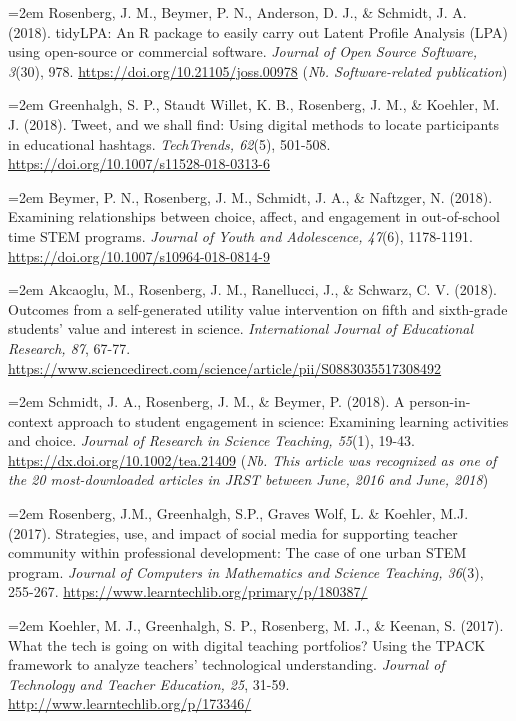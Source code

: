 \documentclass[14,]{article}
\begin{document}
\hangindent=2em Rosenberg, J. M., Beymer, P. N., Anderson, D. J., \&
Schmidt, J. A. (2018). tidyLPA: An R package to easily carry out Latent
Profile Analysis (LPA) using open-source or commercial software.
\emph{Journal of Open Source Software, 3}(30), 978.
\url{https://doi.org/10.21105/joss.00978} (\emph{Nb. Software-related
publication})

\hangindent=2em Greenhalgh, S. P., Staudt Willet, K. B., Rosenberg, J.
M., \& Koehler, M. J. (2018). Tweet, and we shall find: Using digital
methods to locate participants in educational hashtags.
\emph{TechTrends, 62}(5), 501-508.
\url{https://doi.org/10.1007/s11528-018-0313-6}

\hangindent=2em Beymer, P. N., Rosenberg, J. M., Schmidt, J. A., \&
Naftzger, N. (2018). Examining relationships between choice, affect, and
engagement in out-of-school time STEM programs. \emph{Journal of Youth
and Adolescence, 47}(6), 1178-1191.
\url{https://doi.org/10.1007/s10964-018-0814-9}

\hangindent=2em Akcaoglu, M., Rosenberg, J. M., Ranellucci, J., \&
Schwarz, C. V. (2018). Outcomes from a self-generated utility value
intervention on fifth and sixth-grade students' value and interest in
science. \emph{International Journal of Educational Research, 87},
67-77.
\url{https://www.sciencedirect.com/science/article/pii/S0883035517308492}

\hangindent=2em Schmidt, J. A., Rosenberg, J. M., \& Beymer, P. (2018).
A person-in-context approach to student engagement in science: Examining
learning activities and choice. \emph{Journal of Research in Science
Teaching, 55}(1), 19-43. \url{https://dx.doi.org/10.1002/tea.21409}
(\emph{Nb. This article was recognized as one of the 20 most-downloaded
articles in JRST between June, 2016 and June, 2018})

\hangindent=2em Rosenberg, J.M., Greenhalgh, S.P., Graves Wolf, L. \&
Koehler, M.J. (2017). Strategies, use, and impact of social media for
supporting teacher community within professional development: The case
of one urban STEM program. \emph{Journal of Computers in Mathematics and
Science Teaching, 36}(3), 255-267.
\url{https://www.learntechlib.org/primary/p/180387/}

\hangindent=2em Koehler, M. J., Greenhalgh, S. P., Rosenberg, M. J., \&
Keenan, S. (2017). What the tech is going on with digital teaching
portfolios? Using the TPACK framework to analyze teachers' technological
understanding. \emph{Journal of Technology and Teacher Education, 25},
31-59. \url{http://www.learntechlib.org/p/173346/}
\end{document}
